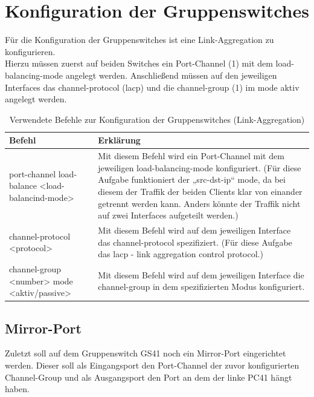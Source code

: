 \documentclass{article}
\begin{document}
\pagebreak

\section{Konfiguration der Gruppenswitches}

Für die Konfiguration der Gruppenswitches ist eine Link-Aggregation zu konfigurieren.\\
Hierzu müssen zuerst auf beiden Switches ein Port-Channel (1) mit dem load-balancing-mode angelegt werden. Anschließend müssen auf den jeweiligen Interfaces das channel-protocol (lacp) und die channel-group (1) im mode aktiv angelegt werden.\\

\begin{table}[htbp]
    \centering
    \begin{tabularx}{\textwidth}{|X|X|}
        \toprule
        \textbf{Befehl} & \textbf{Erklärung} \\
        \midrule
        port-channel load-balance <load-balancind-mode> & Mit diesem Befehl wird ein Port-Channel mit dem jeweiligen load-balancing-mode konfiguriert. (Für diese Aufgabe funktioniert der „src-dst-ip“ mode, da bei diesem der Traffik der beiden Clients klar von einander getrennt werden kann. Anders könnte der Traffik nicht auf zwei Interfaces aufgeteilt werden.)\\
        \hline
        channel-protocol <protocol> & Mit diesem Befehl wird auf dem jeweiligen Interface das channel-protocol spezifiziert. (Für diese Aufgabe das lacp - link aggregation control protocol.)\\
        \hline
        channel-group <number> mode <aktiv/passive> & Mit diesem Befehl wird auf dem jeweiligen Interface die channel-group in dem spezifizierten Modus konfiguriert.\\
        \bottomrule
    \end{tabularx}
    \caption{Verwendete Befehle zur Konfiguration der Gruppenswitches (Link-Aggregation)}
    \label{tab:commands}
\end{table}

\subsection{Mirror-Port}

Zuletzt soll auf dem Gruppenswitch GS41 noch ein Mirror-Port eingerichtet werden. Dieser soll als Eingangsport den Port-Channel der zuvor konfigurierten Channel-Group und als Ausgangsport den Port an dem der linke PC41 hängt haben.
\end{document}
